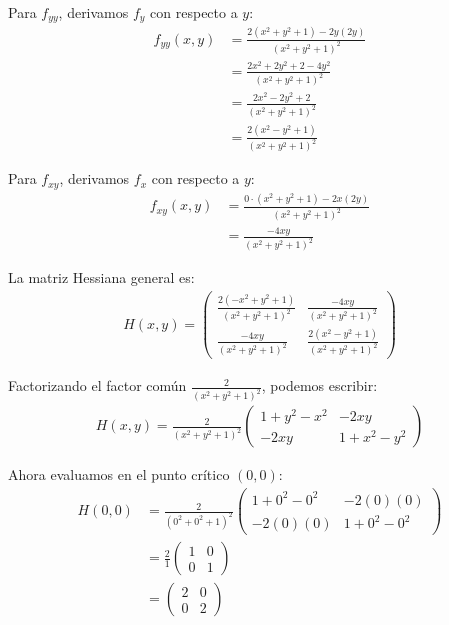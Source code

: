 \documentclass{article}
\begin{document}
Para $f_{yy}$, derivamos $f_y$ con respecto a $y$:
\begin{align}
f_{yy}(x,y) &= \frac{2(x^2 + y^2 + 1) - 2y(2y)}{(x^2 + y^2 + 1)^2} \\
&= \frac{2x^2 + 2y^2 + 2 - 4y^2}{(x^2 + y^2 + 1)^2} \\
&= \frac{2x^2 - 2y^2 + 2}{(x^2 + y^2 + 1)^2} \\
&= \frac{2(x^2 - y^2 + 1)}{(x^2 + y^2 + 1)^2}
\end{align}

Para $f_{xy}$, derivamos $f_x$ con respecto a $y$:
\begin{align}
f_{xy}(x,y) &= \frac{0 \cdot (x^2 + y^2 + 1) - 2x(2y)}{(x^2 + y^2 + 1)^2} \\
&= \frac{-4xy}{(x^2 + y^2 + 1)^2}
\end{align}

La matriz Hessiana general es:
\begin{align}
H(x,y) =  \begin{pmatrix} 
\frac{2(-x^2 + y^2 + 1)}{(x^2 + y^2 + 1)^2} & \frac{-4xy}{(x^2 + y^2 + 1)^2} \\
\frac{-4xy}{(x^2 + y^2 + 1)^2} & \frac{2(x^2 - y^2 + 1)}{(x^2 + y^2 + 1)^2}
\end{pmatrix}
\end{align}

Factorizando el factor común $\frac{2}{(x^2 + y^2 + 1)^2}$, podemos escribir:
\begin{align}
H(x,y) = \frac{2}{(x^2 + y^2 + 1)^2} \begin{pmatrix} 
1 + y^2 - x^2 & -2xy \\
-2xy & 1 + x^2 - y^2
\end{pmatrix}
\end{align}

Ahora evaluamos en el punto crítico $(0,0)$:
\begin{align}
H(0,0) &= \frac{2}{(0^2 + 0^2 + 1)^2} \begin{pmatrix} 
1 + 0^2 - 0^2 & -2(0)(0) \\
-2(0)(0) & 1 + 0^2 - 0^2
\end{pmatrix} \\
&= \frac{2}{1} \begin{pmatrix} 
1 & 0 \\
0 & 1
\end{pmatrix} \\
&= \begin{pmatrix} 
2 & 0 \\
0 & 2
\end{pmatrix}
\end{align}
\end{document}
